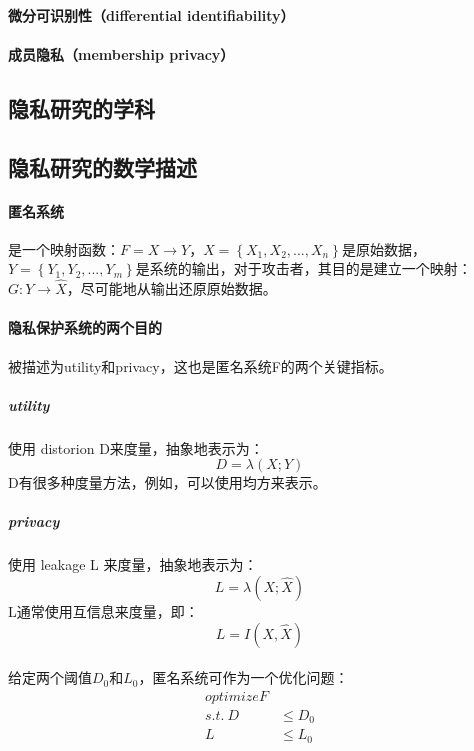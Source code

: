 \documentclass[12pt,a4paper]{article}
\begin{document}
\paragraph{微分可识别性（differential identifiability）}
\paragraph{成员隐私（membership privacy）} 

\subsection{隐私研究的学科}

\subsection{隐私研究的数学描述}
\paragraph{匿名系统} 是一个映射函数：$F = X \rightarrow Y$，$X = \left \{ X_1,X_2,...,X_n \right \}$是原始数据，$Y=\left \{ Y_1,Y_2,...,Y_m \right \}$是系统的输出，对于攻击者，其目的是建立一个映射：$G: Y \rightarrow \hat X$，尽可能地从输出还原原始数据。
\paragraph{隐私保护系统的两个目的} 被描述为utility和privacy，这也是匿名系统F的两个关键指标。
	\subparagraph{utility} 使用 distorion D来度量，抽象地表示为：
	\begin{equation}
		D=\lambda(X;Y)
	\end{equation}
	D有很多种度量方法，例如，可以使用均方来表示。
	\subparagraph{privacy} 使用 leakage L 来度量，抽象地表示为：
	\begin{equation}
		L=\lambda(X;\hat X)
	\end{equation}
	L通常使用互信息来度量，即：
	\begin{equation}
		L=I(X,\hat X)
	\end{equation}
	
\paragraph{} 给定两个阈值$D_0$和$L_0$，匿名系统可作为一个优化问题：
\begin{equation}
  \begin{split}
  	optimize F \\
	s.t. \ D &\leq D_0 \\
	L &\leq L_0
  \end{split}
\end{equation}
\end{document}
